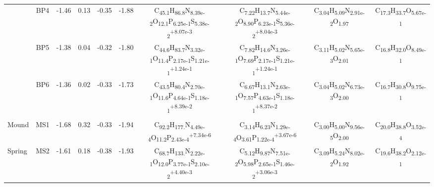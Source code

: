 {\begin{landscape}
\begin{table}
\begin{adjustbox}{width=600pt,keepaspectratio}
\begin{threeparttable}
\begin{tabular}{lccccccccc}
      & BP4   & -1.46 & 0.13  & -0.35 & -1.88 & C\textsubscript{45.1}H\textsubscript{86.8}N\textsubscript{8.39e-2}O\textsubscript{12.1}P\textsubscript{6.25e-1}S\textsubscript{5.38e-2}\textsuperscript{+8.07e-3} & C\textsubscript{7.22}H\textsubscript{13.7}N\textsubscript{5.44e-2}O\textsubscript{8.90}P\textsubscript{6.23e-1}S\textsubscript{5.36e-2}\textsuperscript{+8.04e-3} & C\textsubscript{3.04}H\textsubscript{5.09}N\textsubscript{2.91e-2}O\textsubscript{1.97} & C\textsubscript{17.3}H\textsubscript{33.7}O\textsubscript{5.67e-1} \\
      & BP5   & -1.38 & 0.04  & -0.32 & -1.80 & C\textsubscript{44.6}H\textsubscript{83.7}N\textsubscript{3.32e-1}O\textsubscript{11.4}P\textsubscript{2.17e-1}S\textsubscript{1.21e-1}\textsuperscript{+1.24e-1} & C\textsubscript{7.82}H\textsubscript{14.6}N\textsubscript{3.26e-1}O\textsubscript{7.69}P\textsubscript{2.17e-1}S\textsubscript{1.21e-1}\textsuperscript{+1.24e-1} & C\textsubscript{3.11}H\textsubscript{5.02}N\textsubscript{5.65e-3}O\textsubscript{2.01} & C\textsubscript{16.8}H\textsubscript{32.0}O\textsubscript{8.49e-1} \\
      & BP6   & -1.36 & 0.02  & -0.33 & -1.73 & C\textsubscript{43.5}H\textsubscript{80.4}N\textsubscript{2.70e-1}O\textsubscript{11.6}P\textsubscript{4.64e-1}S\textsubscript{1.18e-1}\textsuperscript{+8.39e-2} & C\textsubscript{6.67}H\textsubscript{13.1}N\textsubscript{2.63e-1}O\textsubscript{7.57}P\textsubscript{4.63e-1}S\textsubscript{1.18e-1}\textsuperscript{+8.37e-2} & C\textsubscript{3.04}H\textsubscript{5.02}N\textsubscript{6.73e-3}O\textsubscript{2.00} & C\textsubscript{16.7}H\textsubscript{30.8}O\textsubscript{9.75e-1} \\
      &       &       &       &       &       &       &       &       &  \\
Mound & MS1   & -1.68 & 0.32  & -0.33 & -1.94 & C\textsubscript{92.2}H\textsubscript{177.}N\textsubscript{4.49e-4}O\textsubscript{11.2}P\textsubscript{2.43e-4}\textsuperscript{+7.34e-6} & C\textsubscript{3.14}H\textsubscript{6.23}N\textsubscript{1.29e-4}O\textsubscript{3.61}P\textsubscript{1.22e-4}\textsuperscript{+3.67e-6} & C\textsubscript{3.00}H\textsubscript{5.00}N\textsubscript{9.56e-5}O\textsubscript{2.00} & C\textsubscript{20.0}H\textsubscript{38.8}O\textsubscript{3.52e-4} \\
Spring & MS2   & -1.61 & 0.18  & -0.38 & -1.93 & C\textsubscript{68.7}H\textsubscript{133.}N\textsubscript{2.22e-1}O\textsubscript{12.0}P\textsubscript{3.77e-1}S\textsubscript{2.10e-2}\textsuperscript{+4.40e-3} & C\textsubscript{5.12}H\textsubscript{9.87}N\textsubscript{7.51e-2}O\textsubscript{5.98}P\textsubscript{2.65e-1}S\textsubscript{1.46e-2}\textsuperscript{+3.06e-3} & C\textsubscript{3.09}H\textsubscript{5.24}N\textsubscript{8.02e-2}O\textsubscript{1.92} & C\textsubscript{19.6}H\textsubscript{38.2}O\textsubscript{2.12e-1} \\

\end{tabular}
\end{threeparttable}
\end{adjustbox}
\end{table}
\end{landscape}}
